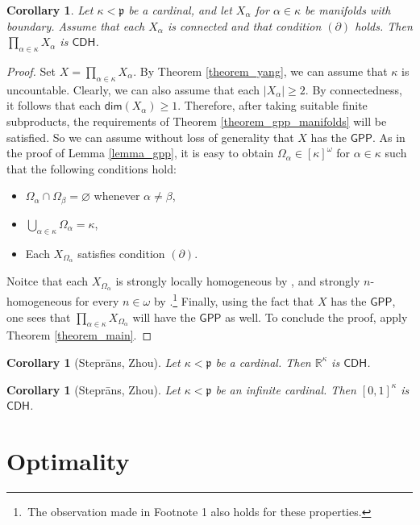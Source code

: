 \documentclass{amsart}
\theoremstyle{plain}
\newtheorem{corollary}[theorem]{Corollary}
\theoremstyle{definition}
\newcommand{\dime}{\mathsf{dim}}
\newcommand{\CDH}{\mathsf{CDH}}
\newcommand{\GPP}{\mathsf{GPP}}
\newcommand{\RRR}{\mathbb{R}}
\newcommand{\pppp}{\mathfrak{p}}
\begin{document}
\begin{corollary}\label{corollary_main_manifolds}
Let $\kappa<\pppp$ be a cardinal, and let $X_\alpha$ for $\alpha\in\kappa$ be manifolds with boundary. Assume that each $X_\alpha$ is connected and that condition $(\partial)$ holds. Then $\prod_{\alpha\in\kappa}X_\alpha$ is $\CDH$.
\end{corollary}
\begin{proof}
Set $X=\prod_{\alpha\in\kappa}X_\alpha$. By Theorem \ref{theorem_yang}, we can assume that $\kappa$ is uncountable. Clearly, we can also assume that each $|X_\alpha|\geq 2$. By connectedness, it follows that each $\dime(X_\alpha)\geq 1$. Therefore, after taking suitable finite subproducts, the requirements of Theorem \ref{theorem_gpp_manifolds} will be satisfied. So we can assume without loss of generality that $X$ has the $\GPP$. As in the proof of Lemma \ref{lemma_gpp}, it is easy to obtain $\Omega_\alpha\in [\kappa]^\omega$ for $\alpha\in\kappa$ such that the following conditions hold:
\begin{itemize}
\item $\Omega_\alpha\cap\Omega_\beta=\varnothing$ whenever $\alpha\neq\beta$,
\item $\bigcup_{\alpha\in\kappa}\Omega_\alpha=\kappa$,
\item Each $X_{\Omega_\alpha}$ satisfies condition $(\partial)$.
\end{itemize}
Noitce that each $X_{\Omega_\alpha}$ is strongly locally homogeneous by \cite[Theorem 3 and Remark 2]{yang}, and strongly $n$-homogeneous for every $n\in\omega$ by \cite[Theorem 2 and Remark 2]{yang}.\footnote{\,The observation made in Footnote 1 also holds for these properties.} Finally, using the fact that $X$ has the $\GPP$, one sees that $\prod_{\alpha\in\kappa}X_{\Omega_\alpha}$ will have the $\GPP$ as well. To conclude the proof, apply Theorem \ref{theorem_main}.
\end{proof}

\begin{corollary}[Stepr\={a}ns, Zhou]\label{corollary_main_reals}
Let $\kappa<\pppp$ be a cardinal. Then $\RRR^\kappa$ is $\CDH$.
\end{corollary}

\begin{corollary}[Stepr\={a}ns, Zhou]\label{corollary_main_hilbert}
Let $\kappa<\pppp$ be an infinite cardinal. Then $[0,1]^\kappa$ is $\CDH$.
\end{corollary}

\section{Optimality}\label{section_optimality}
\end{document}
